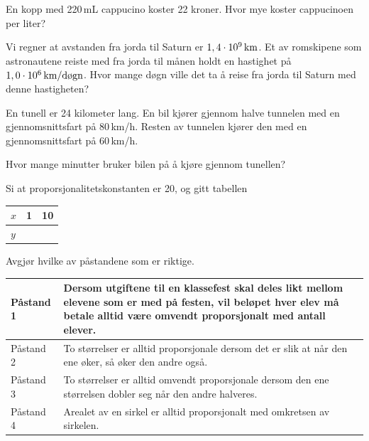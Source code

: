 En kopp med 220\,mL cappucino koster 22 kroner.	Hvor mye koster cappucinoen per liter?

Vi regner at avstanden fra jorda til Saturn er $1,4\cdot10^9\,\text{km}$. Et av romskipene som astronautene reiste med fra jorda til månen holdt en hastighet på $1,0\cdot10^6\,\text{km/døgn}$. Hvor mange døgn ville det ta å reise fra jorda til Saturn med denne hastigheten?

En tunell er 24 kilometer lang. En bil kjører gjennom halve tunnelen med en
gjennomsnittsfart på 80\,km/h. Resten av tunnelen kjører den med en gjennomsnittsfart på 60\,km/h. \os

Hvor mange minutter bruker bilen på å kjøre gjennom tunellen?

Si at proporsjonalitetskonstanten er 20, og gitt tabellen
\begin{center}
	\begin{tabular}{l | c |c|}
		$x$ & 1 & 10 \\ \hline
		$y$ &   &  \\ 
	\end{tabular}
\end{center}

Avgjør hvilke av påstandene som er riktige.
\begin{center}
	\begin{tabular}{p{2cm} | p{8cm}}
		\hline
		Påstand 1 & Dersom utgiftene til en klassefest skal deles likt mellom elevene som er
		med på festen, vil beløpet hver elev må betale alltid være omvendt
		proporsjonalt med antall elever. \\ \hline
		Påstand 2 & To størrelser er alltid proporsjonale dersom det er slik at når den ene
		øker, så øker den andre også. \\ \hline
		Påstand 3& To størrelser er alltid omvendt proporsjonale dersom den ene størrelsen
		dobler seg når den andre halveres. \\ \hline
		Påstand 4& Arealet av en sirkel er alltid proporsjonalt med omkretsen av sirkelen.\\
		\hline	
	\end{tabular}
\end{center}

